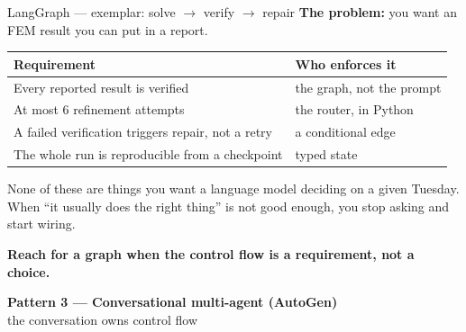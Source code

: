 \documentclass[aspectratio=169,10pt]{beamer}
\newcommand{\hl}[1]{\textcolor{accent}{\textbf{#1}}}
\begin{document}
\begin{frame}{LangGraph --- exemplar: solve $\to$ verify $\to$ repair}
\textbf{The problem:} you want an FEM result you can put in a report.

\vspace{0.8em}
\begin{center}\small
\begin{tabular}{@{}ll@{}}
\toprule
\textbf{Requirement} & \textbf{Who enforces it} \\
\midrule
Every reported result is verified & the graph, not the prompt \\
At most 6 refinement attempts & the router, in Python \\
A failed verification triggers repair, not a retry & a conditional edge \\
The whole run is reproducible from a checkpoint & typed state \\
\bottomrule
\end{tabular}
\end{center}

\vspace{1em}
None of these are things you want a language model deciding on a given Tuesday.
When ``it usually does the right thing'' is not good enough, you stop asking and
start wiring.

\vspace{0.8em}
\begin{center}
\hl{Reach for a graph when the control flow is a requirement, not a choice.}
\end{center}
\end{frame}

\begin{frame}[plain]
\begin{center}
{\Large\bfseries Pattern 3 --- Conversational multi-agent (AutoGen)}\\[0.5em]
{\large\color{gray} the conversation owns control flow}
\end{center}
\end{frame}
\end{document}
